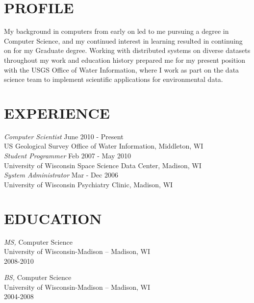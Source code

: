 \documentclass[line,margin]{res}
\begin{document}
\address{8505 Research Way, Middleton WI 53562}
\address{email: jiwalker@usgs.gov | phone: 608.821.3842}
 
\begin{resume}
 
\section{PROFILE} My background in computers from early on led to me pursuing a degree in Computer Science, and my continued interest in learning resulted in continuing on for my Graduate degree.  Working with distributed systems on diverse datasets throughout my work and education history prepared me for my present position with the USGS Office of Water Information, where I work as part on the data science team to implement scientific applications for environmental data.
 
\section{EXPERIENCE} 	{\sl Computer Scientist} \hfill June 2010 - Present \\
                US Geological Survey Office of Water Information, Middleton, WI \\
		{\sl Student Programmer} \hfill Feb 2007 - May 2010 \\
                University of Wisconsin Space Science Data Center, Madison, WI\\
		{\sl System Administrator} \hfill Mar - Dec 2006 \\
	     University of Wisconsin Psychiatry Clinic, Madison, WI \\
 
\section{EDUCATION} {\sl MS,} Computer Science \\
        	     	University of Wisconsin-Madison -- Madison, WI \\ 
                	2008-2010

		{\sl BS,} Computer Science \\
		University of Wisconsin-Madison -- Madison, WI \\
		2004-2008
  

\end{resume}
\end{document}
